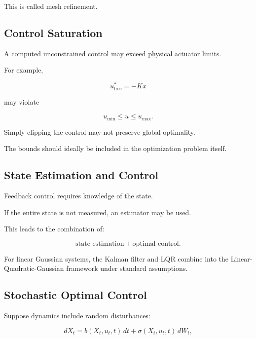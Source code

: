 This is called mesh refinement.

\subsection{Control Saturation}
\label{subsec:control-saturation}

A computed unconstrained control may exceed physical actuator limits.

For example,

\[
u^*_{\mathrm{free}}
=
-Kx
\]

may violate

\[
u_{\min}
\leq
u
\leq
u_{\max}.
\]

Simply clipping the control may not preserve global optimality.

The bounds should ideally be included in the optimization problem itself.

\subsection{State Estimation and Control}
\label{subsec:state-estimation-control}

Feedback control requires knowledge of the state.

If the entire state is not measured, an estimator may be used.

This leads to the combination of:

\[
\boxed{
\text{state estimation}
+
\text{optimal control}.
}
\]

For linear Gaussian systems, the Kalman filter and LQR combine into the
Linear-Quadratic-Gaussian framework under standard assumptions.

\subsection{Stochastic Optimal Control}
\label{subsec:stochastic-optimal-control}

Suppose dynamics include random disturbances:

\[
\boxed{
dX_t
=
b
(
X_t,
u_t,t
)
\,dt
+
\sigma
(
X_t,u_t,t
)
\,dW_t,
}
\]

